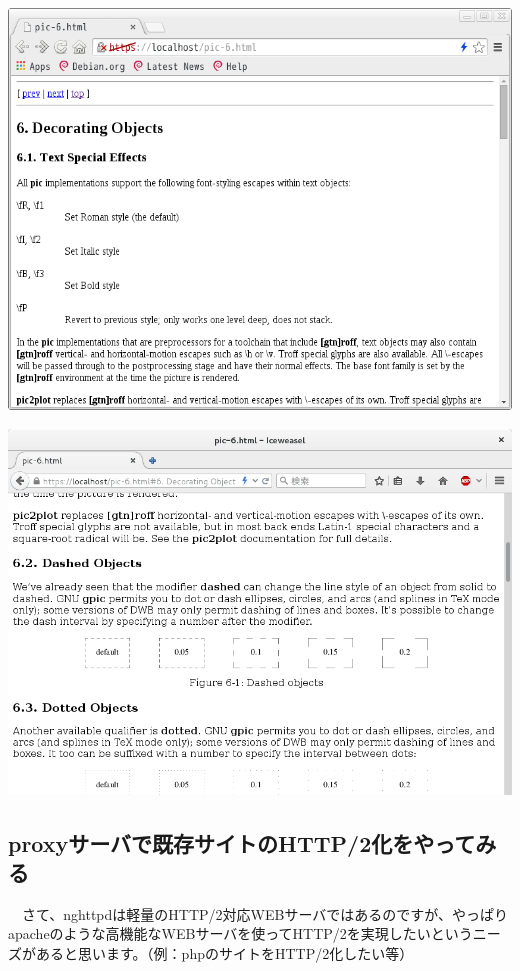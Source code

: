 \documentclass[mingoth,a4paper]{jsarticle}
\begin{document}
\begin{minipage}{0.5\hsize}
\includegraphics[width=0.9\hsize]{image201507/chromium-groff-access.png}
\end{minipage}
\begin{minipage}{0.5\hsize}
\includegraphics[width=0.9\hsize]{image201507/iceweasel-groff-access.png}
\end{minipage}
 
\subsection{proxyサーバで既存サイトのHTTP/2化をやってみる}

　さて、nghttpdは軽量のHTTP/2対応WEBサーバではあるのですが、やっぱりapacheのような高機能なWEBサーバを使ってHTTP/2を実現したいというニーズがあると思います。（例：phpのサイトをHTTP/2化したい等）
\end{document}
